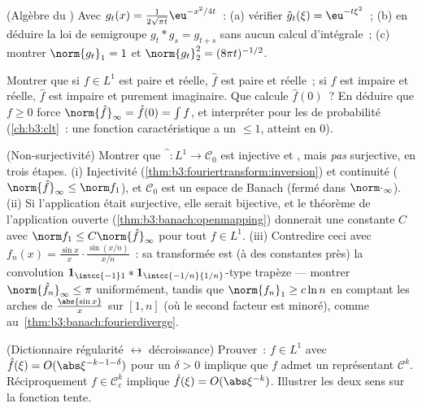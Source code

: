 \begin{exercise}[$\star\star$]\label{exo:b3:fouriertransform:4}
(Algèbre du ) Avec $g_t(x) =
\frac1{2\sqrt{\pi t}}\eu^{-x^2/4t}$~:
(a) vérifier $\hat g_t(\xi) = \eu^{-t\xi^2}$~;
(b) en déduire la loi de semigroupe $g_t * g_s = g_{t+s}$ sans
aucun calcul d'intégrale~;
(c) montrer $\norm{g_t}_1 = 1$ et $\norm{g_t}_2^2 =
(8\pi t)^{-1/2}$.
\end{exercise}

\begin{exercise}[$\star\star$]\label{exo:b3:fouriertransform:5}
Montrer que si $f \in L^1$ est paire et réelle, $\hat f$ est
paire et réelle~; si $f$ est impaire et réelle, $\hat f$ est
impaire et purement imaginaire. Que calcule $\hat f(0)$~? En
déduire que $f \geq 0$ force $\norm{\hat f}_\infty = \hat
f(0) = \int f$, et interpréter pour les  de
probabilité (\cref{ch:b3:clt}~: une fonction caractéristique
a un  $\leq 1$, atteint en $0$).
\end{exercise}

\begin{exercise}[$\star\star\star$]\label{exo:b3:fouriertransform:6}
(Non-surjectivité) Montrer que $\widehat{\phantom f}\colon
L^1 \to \mathcal C_0$ est injective et , mais
\emph{pas} surjective, en trois étapes.
(i) Injectivité (\cref{thm:b3:fouriertransform:inversion}) et
continuité ($\norm{\hat f}_\infty \leq \norm f_1$), et
$\mathcal C_0$ est un espace de Banach (fermé dans
$\norm\cdot_\infty$).
(ii) Si l'application était surjective, elle serait bijective,
et le théorème de l'application ouverte
(\cref{thm:b3:banach:openmapping}) donnerait une constante $C$
avec $\norm f_1 \leq C\norm{\hat f}_\infty$ pour tout $f \in
L^1$.
(iii) Contredire ceci avec $f_n(x) = \frac{\sin
x}{x}\cdot\frac{\sin(x/n)}{x/n}$~: sa transformée est (à des
constantes près) la convolution $\mathbf 1_{\intcc{-1}1} *
\mathbf 1_{\intcc{-1/n}{1/n}}$-type trapèze --- montrer
$\norm{\hat f_n}_\infty \leq \pi$ uniformément, tandis que
$\norm{f_n}_1 \geq c\ln n$ en comptant les arches de
$\frac{\abs{\sin x}}x$ sur $[1, n]$ (où le second facteur est
minoré), comme au~\cref{thm:b3:banach:fourierdiverge}.
\end{exercise}

\begin{exercise}[$\star\star$]\label{exo:b3:fouriertransform:7}
(Dictionnaire régularité $\leftrightarrow$ décroissance)
Prouver~: $f \in L^1$ avec $\hat f(\xi) =
O(\abs\xi^{-k-1-\delta})$ pour un $\delta > 0$ implique que
$f$ admet un représentant $\mathcal C^k$. Réciproquement $f
\in \mathcal C^k_c$ implique $\hat f(\xi) = O(\abs\xi^{-k})$.
Illustrer les deux sens sur la fonction tente.
\end{exercise}

